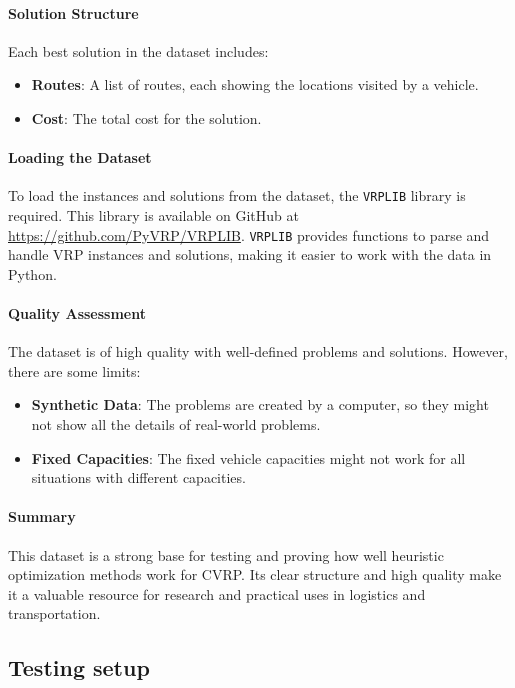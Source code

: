 \documentclass{article}
\begin{document}
    \paragraph{Solution Structure}
    Each best solution in the dataset includes:
    \begin{itemize}
        \item \textbf{Routes}: A list of routes, each showing the locations visited by a vehicle.
        \item \textbf{Cost}: The total cost for the solution.
    \end{itemize}

    \paragraph{Loading the Dataset}
    To load the instances and solutions from the dataset, the \texttt{VRPLIB} library is required.
    This library is available on GitHub at \url{https://github.com/PyVRP/VRPLIB}.
    \texttt{VRPLIB} provides functions to parse and handle VRP instances and solutions, making it easier to work with the data in Python.

    \paragraph{Quality Assessment}
    The dataset is of high quality with well-defined problems and solutions. However, there are some limits:
    \begin{itemize}
        \item \textbf{Synthetic Data}: The problems are created by a computer, so they might not show all the details of real-world problems.
        \item \textbf{Fixed Capacities}: The fixed vehicle capacities might not work for all situations with different capacities.
    \end{itemize}

    \paragraph{Summary}
    This dataset is a strong base for testing and proving how well heuristic optimization methods work for CVRP. Its clear structure and high quality make it a valuable resource for research and practical uses in logistics and transportation.

    \subsection{Testing setup}
\end{document}
